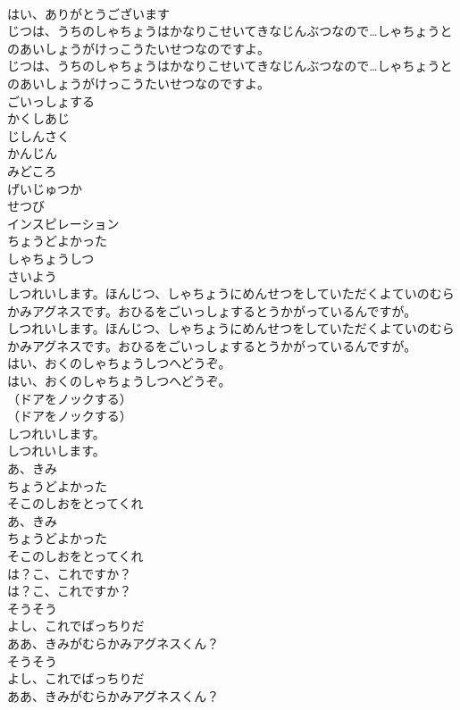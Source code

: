 \documentclass[8pt]{extreport}
\begin{document}
\begin{CJK}{UTF8}{min}
\\	はい、ありがとうございます
\\	じつは、うちのしゃちょうはかなりこせいてきなじんぶつなので…しゃちょうとのあいしょうがけっこうたいせつなのですよ。
\\	じつは、うちのしゃちょうはかなりこせいてきなじんぶつなので…しゃちょうとのあいしょうがけっこうたいせつなのですよ。
\\	ごいっしょする
\\	かくしあじ
\\	じしんさく
\\	かんじん
\\	みどころ
\\	げいじゅつか
\\	せつび
\\	インスピレーション
\\	ちょうどよかった
\\	しゃちょうしつ
\\	さいよう
\\	しつれいします。ほんじつ、しゃちょうにめんせつをしていただくよていのむらかみアグネスです。おひるをごいっしょするとうかがっているんですが。
\\	しつれいします。ほんじつ、しゃちょうにめんせつをしていただくよていのむらかみアグネスです。おひるをごいっしょするとうかがっているんですが。
\\	はい、おくのしゃちょうしつへどうぞ。
\\	はい、おくのしゃちょうしつへどうぞ。
\\	（ドアをノックする）
\\	（ドアをノックする）
\\	しつれいします。
\\	しつれいします。
\\	あ、きみ
\\	ちょうどよかった
\\	そこのしおをとってくれ
\\	あ、きみ
\\	ちょうどよかった
\\	そこのしおをとってくれ
\\	は？こ、これですか？
\\	は？こ、これですか？
\\	そうそう
\\	よし、これでばっちりだ
\\	ああ、きみがむらかみアグネスくん？
\\	そうそう
\\	よし、これでばっちりだ
\\	ああ、きみがむらかみアグネスくん？

\end{CJK}
\end{document}
